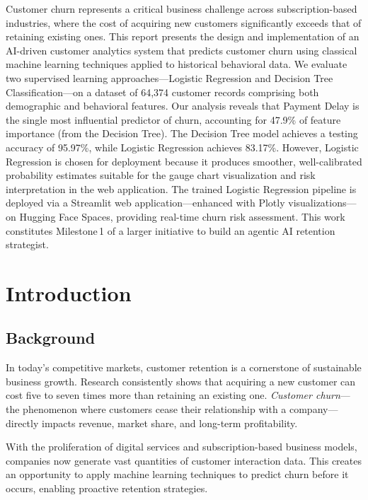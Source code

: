 \documentclass[12pt, a4paper]{article}
\begin{document}
Customer churn represents a critical business challenge across subscription-based industries, where the cost of acquiring new customers significantly exceeds that of retaining existing ones. This report presents the design and implementation of an AI-driven customer analytics system that predicts customer churn using classical machine learning techniques applied to historical behavioral data. We evaluate two supervised learning approaches---Logistic Regression and Decision Tree Classification---on a dataset of 64,374 customer records comprising both demographic and behavioral features. Our analysis reveals that Payment Delay is the single most influential predictor of churn, accounting for 47.9\% of feature importance (from the Decision Tree). The Decision Tree model achieves a testing accuracy of 95.97\%, while Logistic Regression achieves 83.17\%. However, Logistic Regression is chosen for deployment because it produces smoother, well-calibrated probability estimates suitable for the gauge chart visualization and risk interpretation in the web application. The trained Logistic Regression pipeline is deployed via a Streamlit web application---enhanced with Plotly visualizations---on Hugging Face Spaces, providing real-time churn risk assessment. This work constitutes Milestone\,1 of a larger initiative to build an agentic AI retention strategist.

\section{Introduction}

\subsection{Background}

In today's competitive markets, customer retention is a cornerstone of sustainable business growth. Research consistently shows that acquiring a new customer can cost five to seven times more than retaining an existing one. \textit{Customer churn}---the phenomenon where customers cease their relationship with a company---directly impacts revenue, market share, and long-term profitability.

With the proliferation of digital services and subscription-based business models, companies now generate vast quantities of customer interaction data. This creates an opportunity to apply machine learning techniques to predict churn before it occurs, enabling proactive retention strategies.
\end{document}
